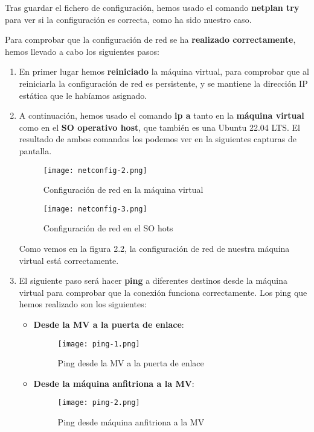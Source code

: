 Tras guardar el fichero de configuración, hemos usado el comando \textbf{netplan try} para ver si la configuración es correcta, como ha sido nuestro caso.

Para comprobar que la configuración de red se ha \textbf{realizado correctamente}, hemos llevado a cabo los siguientes pasos:

\begin{enumerate}
    \item En primer lugar hemos \textbf{reiniciado} la máquina virtual, para comprobar que al reiniciarla la configuración de red es persistente, y se mantiene la dirección IP estática que le habíamos asignado.

    \item A continuación, hemos usado el comando \textbf{ip a} tanto en la \textbf{máquina virtual} como en el \textbf{SO operativo host}, que también es una Ubuntu 22.04 LTS. El resultado de ambos comandos los podemos ver en la siguientes capturas de pantalla.

    \begin{figure}[H]
        \centering
        \texttt{[image: netconfig-2.png]}
        \caption{Configuración de red en la máquina virtual}
    \end{figure}

    \begin{figure}[H]
        \centering
        \texttt{[image: netconfig-3.png]}
        \caption{Configuración de red en el SO hots}
    \end{figure}

    Como vemos en la figura 2.2, la configuración de red de nuestra máquina virtual está correctamente.

    \item El siguiente paso será hacer \textbf{ping} a diferentes destinos desde la máquina virtual para comprobar que la conexión funciona correctamente. Los ping que hemos realizado son los siguientes:

    \begin{itemize}
        \item \textbf{Desde la MV a la puerta de enlace}:
        \begin{figure}[H]
            \centering
            \texttt{[image: ping-1.png]}
            \caption{Ping desde la MV a la puerta de enlace}
        \end{figure}

        \item \textbf{Desde la máquina anfitriona a la MV}:
        \begin{figure}[H]
            \centering
            \texttt{[image: ping-2.png]}
            \caption{Ping desde máquina anfitriona a la MV}
        \end{figure}


\end{itemize}
\end{enumerate}
